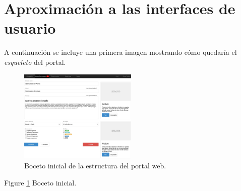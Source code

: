 \section{Aproximación a las interfaces de usuario}
\par A continuación se incluye una primera imagen mostrando cómo quedaría el \textit{esqueleto} del portal.

\begin{figure}
  \centering
    \includegraphics[width=0.5\textwidth]{./img/esqueletoportalweb.jpg}
  \caption{Boceto inicial de la estructura del portal web.}
  \label{fig:bocetoportalweb}
\end{figure}
Figure \ref{fig:bocetoportalweb} Boceto inicial.